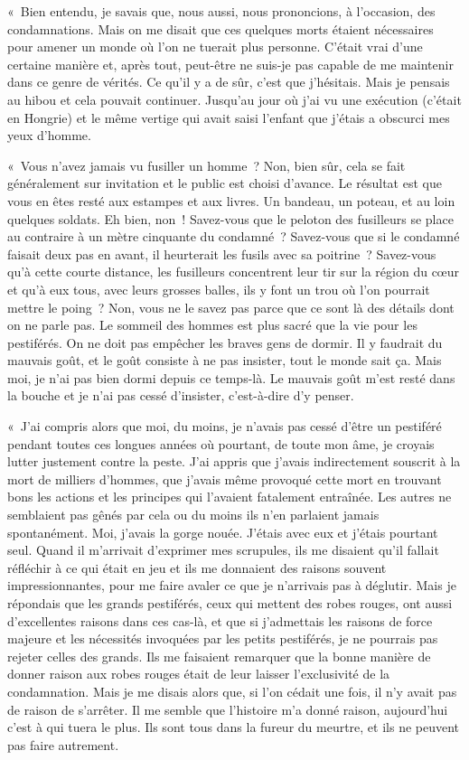 \documentclass[french,twoside]{book} %
\begin{document}
« Bien entendu, je savais que, nous aussi, nous prononcions, à l’occasion, des condamnations. Mais on me disait que ces quelques morts étaient nécessaires pour amener un monde où l’on ne tuerait plus personne. C’était vrai d’une certaine manière et, après tout, peut-être ne suis-je pas capable de me maintenir dans ce genre de vérités. Ce qu’il y a de sûr, c’est que j’hésitais. Mais je pensais au hibou et cela pouvait continuer. Jusqu’au jour où j’ai vu une exécution (c’était en Hongrie) et le même vertige qui avait saisi l’enfant que j’étais a obscurci mes yeux d’homme.\par
« Vous n’avez jamais vu fusiller un homme ? Non, bien sûr, cela se fait généralement sur invitation et le public est choisi d’avance. Le résultat est que vous en êtes resté aux estampes et aux livres. Un bandeau, un poteau, et au loin quelques soldats. Eh bien, non ! Savez-vous que le peloton des fusilleurs se place au contraire à un mètre cinquante du condamné ? Savez-vous que si le condamné faisait deux pas en avant, il heurterait les fusils avec sa poitrine ? Savez-vous qu’à cette courte distance, les fusilleurs concentrent leur tir sur la région du cœur et qu’à eux tous, avec leurs grosses balles, ils y font un trou où l’on pourrait mettre le poing ? Non, vous ne le savez pas parce que ce sont là des détails dont on ne parle pas. Le sommeil des hommes est plus sacré que la vie pour les pestiférés. On ne doit pas empêcher les braves gens de dormir. Il y faudrait du mauvais goût, et le goût consiste à ne pas insister, tout le monde sait ça. Mais moi, je n’ai pas bien dormi depuis ce temps-là. Le mauvais goût m’est resté dans la bouche et je n’ai pas cessé d’insister, c’est-à-dire d’y penser.\par
« J’ai compris alors que moi, du moins, je n’avais pas cessé d’être un pestiféré pendant toutes ces longues années où pourtant, de toute mon âme, je croyais lutter justement contre la peste. J’ai appris que j’avais indirectement souscrit à la mort de milliers d’hommes, que j’avais même provoqué cette mort en trouvant bons les actions et les principes qui l’avaient fatalement entraînée. Les autres ne semblaient pas gênés par cela ou du moins ils n’en parlaient jamais spontanément. Moi, j’avais la gorge nouée. J’étais avec eux et j’étais pourtant seul. Quand il m’arrivait d’exprimer mes scrupules, ils me disaient qu’il fallait réfléchir à ce qui était en jeu et ils me donnaient des raisons souvent impressionnantes, pour me faire avaler ce que je n’arrivais pas à déglutir. Mais je répondais que les grands pestiférés, ceux qui mettent des robes rouges, ont aussi d’excellentes raisons dans ces cas-là, et que si j’admettais les raisons de force majeure et les nécessités invoquées par les petits pestiférés, je ne pourrais pas rejeter celles des grands. Ils me faisaient remarquer que la bonne manière de donner raison aux robes rouges était de leur laisser l’exclusivité de la condamnation. Mais je me disais alors que, si l’on cédait une fois, il n’y avait pas de raison de s’arrêter. Il me semble que l’histoire m’a donné raison, aujourd’hui c’est à qui tuera le plus. Ils sont tous dans la fureur du meurtre, et ils ne peuvent pas faire autrement.\par
\end{document}
